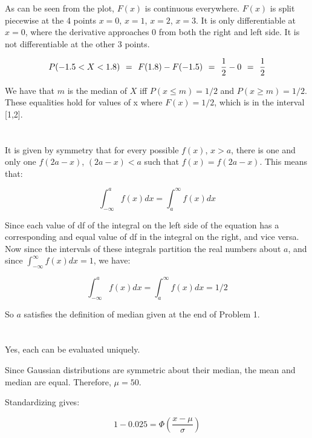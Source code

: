 \documentclass{article}
\begin{document}
As can be seen from the plot, $F(x)$ is continuous everywhere. $F(x)$ is split
piecewise at the 4 points $x=0$, $x=1$, $x=2$, $x=3$. It is only
differentiable at $x=0$, where the derivative approaches 0 from both the
right and left side. It is not differentiable at the other 3 points.

\[
P(-1.5 < X < 1.8) \hspace{4px} = \hspace{4px} F(1.8) - F(-1.5) \hspace{4px}
= \hspace{4pt} \frac{1}{2} - 0 \hspace{4pt} = \hspace{4pt} \frac{1}{2}
\]

We have that $m$ is the median of $X$ iff $P(x \le m) = 1/2$ and 
$P(x \ge m) = 1/2$. These equalities hold for values of x where $F(x) = 1/2$,
which is in the interval [1,2].

\section{}

It is given by symmetry that for every possible $f(x)$, $x > a$,
there is one and only
one $f(2a-x)$, $(2a-x) < a$ such that $f(x) = f(2a-x)$. This means that:

\[
\int_{-\infty}^a f(x) dx = \int_a^{\infty} f(x) dx
\]

Since each value of df of the integral on the left side of the equation has a
corresponding and equal value of df in the integral on the right, and vice
versa. Now since the intervals of these integrals partition the real numbers
about $a$, and since $\int_{-\infty}^{\infty} f(x) dx = 1$, we have:

\[
\int_{-\infty}^a f(x) dx = \int_a^{\infty} f(x) dx = 1/2
\]

So $a$ satisfies the definition of median given at the end of Problem 1.

\section{}
Yes, each can be evaluated uniquely.

Since Gaussian distributions are symmetric about their median, the mean and
median are equal. Therefore, $\mu = 50$.

Standardizing gives:

\[
1 - 0.025 = \Phi \left( \frac{x - \mu}{\sigma} \right)
\]
\end{document}
